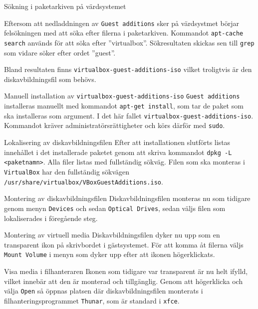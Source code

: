            {Sökning i paketarkiven på värdsystemet}
           {Eftersom att nedladdningen av \texttt{Guest additions} sker på
            värdsystmet börjar felsökningen med att söka efter filerna i
            paketarkiven. Kommandot \texttt{apt-cache search} används för att
            söka efter ''virtualbox''. Sökresultaten skickas sen till
            \texttt{grep} som vidare söker efter ordet ''guest''.
            \par Bland resultaten finns \texttt{virtualbox-guest-additions-iso}
            vilket troligtvis är den diskavbildningsfil som behövs.}
           {}

           {Manuell installation av \texttt{virtualbox-guest-additions-iso}}
           {\texttt{Guest additions} installeras manuellt med kommandot
            \texttt{apt-get install}, som tar de paket som ska installeras som
            argument. I det här fallet \texttt{virtualbox-guest-additions-iso}.
            Kommandot kräver administratörsrättigheter och körs därför med
            \texttt{sudo}.}
           {}

           {Lokalisering av diskavbildningsfilen}
           {Efter att installationen slutförts listas innehållet i det
            installerade paketet genom att skriva kommandot \texttt{dpkg -L
            <paketnamn>}.  Alla filer listas med fullständig sökväg. Filen som
            ska monteras i \texttt{VirtualBox} har den fullständig sökvägen
            \texttt{/usr/share/virtualbox/VBoxGuestAdditions.iso}.}
           {}

           {Montering av diskavbildningsfilen}
           {Diskavbildningsfilen monteras nu som tidigare genom menyn
            \texttt{Devices} och sedan \texttt{Optical Drives}, sedan väljs
            filen som lokaliserades i föregående steg.}
           {}

           {Montering av virtuell media}
           {Diskavbildningsfilen dyker nu upp som en transparent ikon på
            skrivbordet i gästsystemet. För att komma åt filerna väljs
            \texttt{Mount Volume} i menyn som dyker upp efter att ikonen
            högerklickats.}
           {}

           {Visa media i filhanteraren}
           {Ikonen som tidigare var transparent är nu helt ifylld, vilket
            innebär att den är monterad och tillgänglig. Genom att högerklicka
            och välja \texttt{Open} så öppnas platsen där diskavbildningsfilen
            monterats i filhanteringsprogrammet \texttt{Thunar}, som är 
            standard i \texttt{xfce}.}
           {}

